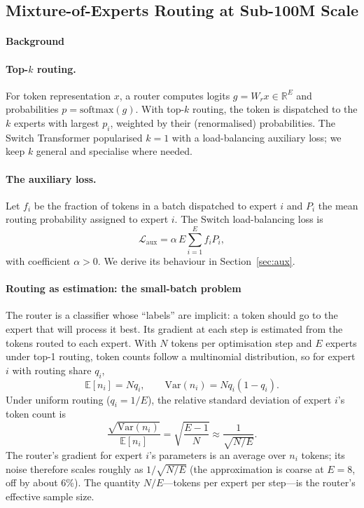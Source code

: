 \subsection{Mixture-of-Experts Routing at Sub-100M Scale}
\label{ch-moe}

\paragraph{Background}

\paragraph{Top-$k$ routing.} For token representation $x$, a router
computes logits $g = W_r x \in \mathbb{R}^E$ and probabilities
$p = \mathrm{softmax}(g)$. With top-$k$ routing, the token is
dispatched to the $k$ experts with largest $p_i$, weighted by their
(renormalised) probabilities. The Switch Transformer
\citep{fedus2022switch} popularised $k=1$ with a load-balancing
auxiliary loss; we keep $k$ general and specialise where needed.

\paragraph{The auxiliary loss.} Let $f_i$ be the fraction of tokens in
a batch dispatched to expert $i$ and $P_i$ the mean routing probability
assigned to expert $i$. The Switch load-balancing loss is
\begin{equation}
  \mathcal{L}_{\mathrm{aux}} = \alpha \, E \sum_{i=1}^{E} f_i P_i ,
  \label{eq:aux}
\end{equation}
with coefficient $\alpha > 0$. We derive its behaviour in
Section~\ref{sec:aux}.

\paragraph{Routing as estimation: the small-batch problem}
\label{sec:tokens}

The router is a classifier whose ``labels'' are implicit: a token
should go to the expert that will process it best. Its gradient at
each step is estimated from the tokens routed to each expert. With
$N$ tokens per optimisation step and $E$ experts under top-1 routing,
token counts follow a multinomial distribution, so for expert $i$ with
routing share $q_i$,
\begin{equation}
  \mathbb{E}[n_i] = N q_i, \qquad
  \mathrm{Var}(n_i) = N q_i (1 - q_i).
\end{equation}
Under uniform routing ($q_i = 1/E$), the relative standard deviation
of expert $i$'s token count is
\begin{equation}
  \frac{\sqrt{\mathrm{Var}(n_i)}}{\mathbb{E}[n_i]}
  = \sqrt{\frac{E - 1}{N}} \approx \frac{1}{\sqrt{N/E}}.
\end{equation}
The router's gradient for expert $i$'s parameters is an average over
$n_i$ tokens; its noise therefore scales roughly as $1/\sqrt{N/E}$
(the approximation is coarse at $E=8$, off by about 6\%). The
quantity $N/E$---tokens per expert per step---is the router's
effective sample size.

